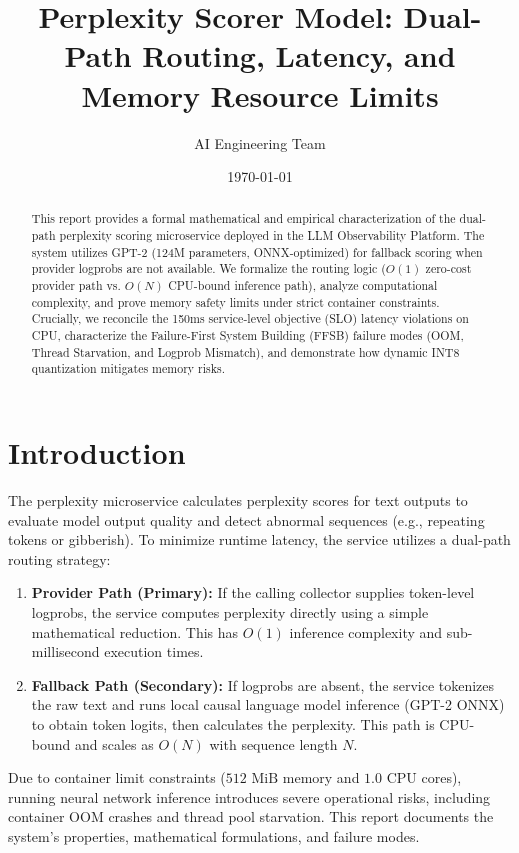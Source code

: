 \documentclass[10pt]{article}
\begin{document}
\title{\textbf{Perplexity Scorer Model: Dual-Path Routing, Latency, and Memory Resource Limits}}
\author{AI Engineering Team}
\date{\today}
\maketitle

\begin{abstract}
This report provides a formal mathematical and empirical characterization of the dual-path perplexity scoring microservice deployed in the LLM Observability Platform. The system utilizes GPT-2 (124M parameters, ONNX-optimized) for fallback scoring when provider logprobs are not available. We formalize the routing logic ($O(1)$ zero-cost provider path vs. $O(N)$ CPU-bound inference path), analyze computational complexity, and prove memory safety limits under strict container constraints. Crucially, we reconcile the 150ms service-level objective (SLO) latency violations on CPU, characterize the Failure-First System Building (FFSB) failure modes (OOM, Thread Starvation, and Logprob Mismatch), and demonstrate how dynamic INT8 quantization mitigates memory risks.
\end{abstract}

\section{Introduction}
The perplexity microservice calculates perplexity scores for text outputs to evaluate model output quality and detect abnormal sequences (e.g., repeating tokens or gibberish). To minimize runtime latency, the service utilizes a dual-path routing strategy:
\begin{enumerate}
\item \textbf{Provider Path (Primary):} If the calling collector supplies token-level logprobs, the service computes perplexity directly using a simple mathematical reduction. This has $O(1)$ inference complexity and sub-millisecond execution times.
\item \textbf{Fallback Path (Secondary):} If logprobs are absent, the service tokenizes the raw text and runs local causal language model inference (GPT-2 ONNX) to obtain token logits, then calculates the perplexity. This path is CPU-bound and scales as $O(N)$ with sequence length $N$.
\end{enumerate}

Due to container limit constraints ($512\text{ MiB}$ memory and $1.0\text{ CPU}$ cores), running neural network inference introduces severe operational risks, including container OOM crashes and thread pool starvation. This report documents the system's properties, mathematical formulations, and failure modes.
\end{document}
